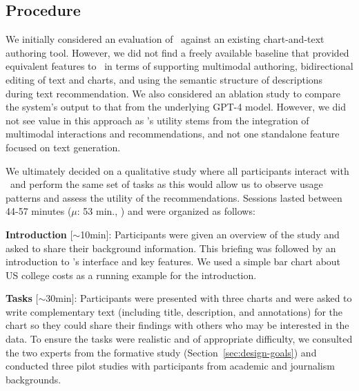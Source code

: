 \subsection{Procedure}

We initially considered an evaluation of \pluto~against an existing chart-and-text authoring tool. However, we did not find a freely available baseline that provided equivalent features to \pluto~in terms of supporting multimodal authoring, bidirectional editing of text and charts, and using the semantic structure of descriptions~\cite{lundgard2021accessible} during text recommendation.
We also considered an ablation study to compare the system's output to that from the underlying GPT-4 model.
However, we did not see value in this approach as \pluto's utility stems from the integration of multimodal interactions and recommendations, and not one standalone feature focused on text generation.

We ultimately decided on a qualitative study where all participants interact with \pluto~and perform the same set of tasks as this would allow us to observe usage patterns and assess the utility of the recommendations.
Sessions lasted between 44-57 minutes ($\mu$: 53 min., ) and were organized as follows:

\vspace{.5em}
\noindent\textbf{Introduction} [$\sim$10min]:
Participants were given an overview of the study and asked to share their background information. This briefing was followed by an introduction to \pluto's interface and key features. We used a simple bar chart about US college costs as a running example for the introduction.

\vspace{.5em}
\noindent\textbf{Tasks} [$\sim$30min]:
Participants were presented with three charts and were asked to write complementary text (including title, description, and annotations) for the chart so they could share their findings with others who may be interested in the data.
To ensure the tasks were realistic and of appropriate difficulty, we consulted the two experts from the formative study (Section~\ref{sec:design-goals}) and conducted three pilot studies with participants from academic and journalism backgrounds.

